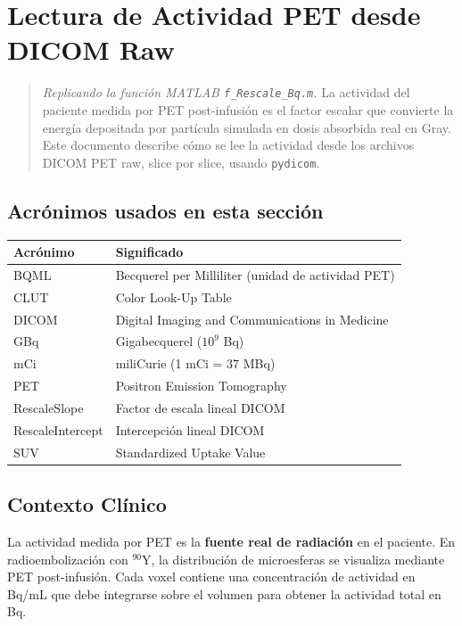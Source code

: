 \documentclass[12pt,a4paper]{article}
\begin{document}
\section{Lectura de Actividad PET desde DICOM Raw}

\begin{quote}
\textit{Replicando la función MATLAB \texttt{f\_Rescale\_Bq.m}.} La actividad del paciente medida por PET post-infusión es el factor escalar que convierte la energía depositada por partícula simulada en dosis absorbida real en Gray. Este documento describe cómo se lee la actividad desde los archivos DICOM PET raw, slice por slice, usando \texttt{pydicom}.
\end{quote}

\subsection*{Acrónimos usados en esta sección}

\begin{tabular}{p{3cm} p{12cm}}
\toprule
\textbf{Acrónimo} & \textbf{Significado} \\
\midrule
BQML & Becquerel per Milliliter (unidad de actividad PET) \\
CLUT & Color Look-Up Table \\
DICOM & Digital Imaging and Communications in Medicine \\
GBq & Gigabecquerel ($10^9$ Bq) \\
mCi & miliCurie (1 mCi = 37 MBq) \\
PET & Positron Emission Tomography \\
RescaleSlope & Factor de escala lineal DICOM \\
RescaleIntercept & Intercepción lineal DICOM \\
SUV & Standardized Uptake Value \\
\bottomrule
\end{tabular}

\subsection{Contexto Clínico}

La actividad medida por PET es la \textbf{fuente real de radiación} en el paciente. En radioembolización con $^{90}$Y, la distribución de microesferas se visualiza mediante PET post-infusión. Cada voxel contiene una concentración de actividad en Bq/mL que debe integrarse sobre el volumen para obtener la actividad total en Bq.
\end{document}
